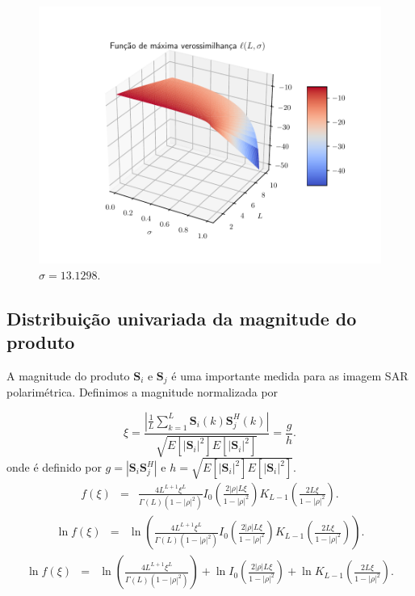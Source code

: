 \documentclass[journal,article,submit,moreauthors,pdftex]{Definitions/mdpi}
\begin{document}
\begin{figure}[hbt]
  	\caption{$\sigma=9.8405 $.}\label{cap_acf_fig04}
\endminipage\hfill
{}
  \includegraphics[width=\linewidth]{funv_max_ver_j_80_flev_razao.pdf}
		\caption{$\sigma=13.1298 $.}\label{cap_acf_fig05}
\endminipage\hfill
\end{figure}






\subsection{Distribuição univariada da magnitude do produto}
A magnitude do produto $\mathbf{S}_i$ e $\mathbf{S}_j$ é uma importante medida para as imagem SAR polarimétrica. Definimos a magnitude normalizada por 

\begin{equation}
	\xi = \frac{\left|\frac{1}{L} \sum_{k=1}^L\mathbf{S}_i(k)\mathbf{S}_j^H(k) \right|}{\sqrt{E[|\mathbf{S}_i|^2]E[|\mathbf{S}_i|^2]}}=\frac{g}{h}.
\end{equation}
onde é definido por $g=|\mathbf{S}_i\mathbf{S}_j^H|$ e $h=\sqrt{E[|\mathbf{S}_i|^2]E[|\mathbf{S}_i|^2]}$.
\begin{equation}
\begin{array}{ccc}
	f(\xi)&=&\frac{4L^{L+1}\xi^L}{\Gamma(L)(1-|\rho|^2)}I_0\left(\frac{2|\rho|L\xi}{1-|\rho|^2}\right)K_{L-1}\left(\frac{2L\xi}{1-|\rho|^2}\right).
		\end{array}
\end{equation}
\begin{equation}
\begin{array}{ccc}
	\ln f(\xi)&=&\ln\left(\frac{4L^{L+1}\xi^L}{\Gamma(L)(1-|\rho|^2)}I_0\left(\frac{2|\rho|L\xi}{1-|\rho|^2}\right)K_{L-1}\left(\frac{2L\xi}{1-|\rho|^2}\right)\right).
		\end{array}
\end{equation}
\begin{equation}
\begin{array}{ccc}
	\ln f(\xi)&=&\ln\left(\frac{4L^{L+1}\xi^L}{\Gamma(L)(1-|\rho|^2)}\right)+\ln I_0\left(\frac{2|\rho|L\xi}{1-|\rho|^2}\right)+ \ln K_{L-1}\left(\frac{2L\xi}{1-|\rho|^2}\right).
		\end{array}
\end{equation}
\end{document}
